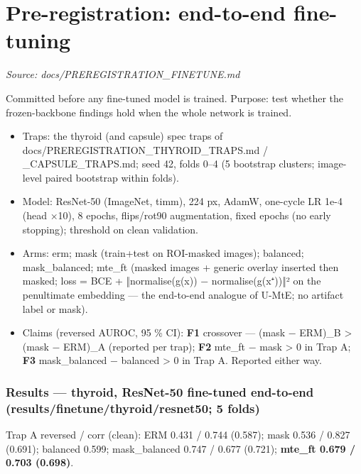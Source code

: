 \section{Pre-registration: end-to-end fine-tuning}\label{doc:PREREGISTRATION_FINETUNE}
\noindent\textit{Source: docs/PREREGISTRATION\_FINETUNE.md}

{\small
Committed before any fine-tuned model is trained. Purpose: test whether the frozen-backbone findings hold when
the whole network is trained.

\begin{itemize}

\item
  Traps: the thyroid (and capsule) spec traps of docs/PREREGISTRATION\_THYROID\_TRAPS.md / \_CAPSULE\_TRAPS.md;
  seed 42, folds 0--4 (5 bootstrap clusters; image-level paired bootstrap within folds).
\item
  Model: ResNet-50 (ImageNet, timm), 224 px, AdamW, one-cycle LR 1e-4 (head ×10), 8 epochs, flips/rot90
  augmentation, fixed epochs (no early stopping); threshold on clean validation.
\item
  Arms: erm; mask (train+test on ROI-masked images); balanced; mask\_balanced; mte\_ft (masked images + generic
  overlay inserted then masked; loss = BCE + ‖normalise(g(x)) − normalise(g(x⁺))‖² on the penultimate embedding ---
  the end-to-end analogue of U-MtE; no artifact label or mask).
\item
  Claims (reversed AUROC, 95 \% CI): \textbf{F1} crossover --- (mask − ERM)\_B \textgreater{} (mask − ERM)\_A (reported per trap);
  \textbf{F2} mte\_ft − mask \textgreater{} 0 in Trap A; \textbf{F3} mask\_balanced − balanced \textgreater{} 0 in Trap A. Reported either way.
\end{itemize}

\subsubsection{Results --- thyroid, ResNet-50 fine-tuned end-to-end (results/finetune/thyroid/resnet50; 5 folds)}\label{results--thyroid-resnet-50-fine-tuned-end-to-end-resultsfinetunethyroidresnet50-5-folds}

Trap A reversed / corr (clean): ERM 0.431 / 0.744 (0.587); mask 0.536 / 0.827 (0.691); balanced 0.599;
mask\_balanced 0.747 / 0.677 (0.721); \textbf{mte\_ft 0.679 / 0.703 (0.698)}.

\begin{itemize}


\end{itemize}}
